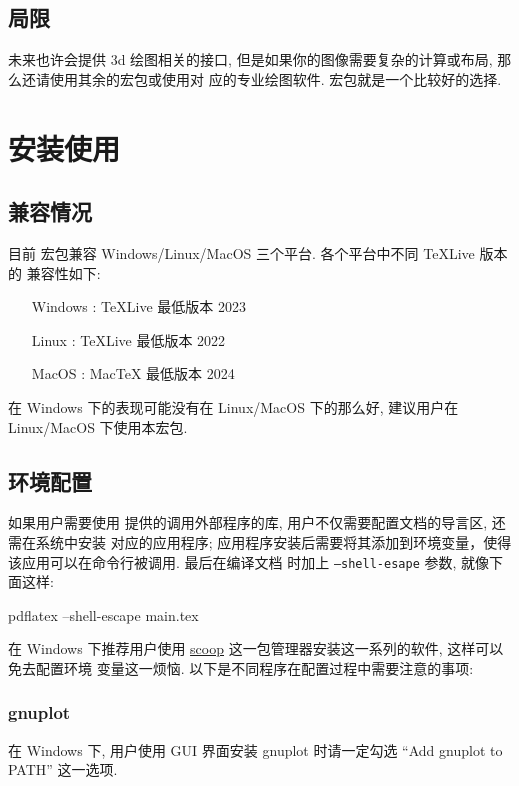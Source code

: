 \documentclass[
  hyper, lang=cn, 
  class=l3dox, 
]{../../zlatex/code/ztex}
\begin{document}
\subsection{局限}
\zTikZ{} 未来也许会提供 3d 绘图相关的接口, 但是如果你的图像需要复杂的计算或布局, 那么还请使用其余的宏包或使用对
应的专业绘图软件.  宏包就是一个比较好的选择.


\clearpage
\section{安装使用}


\subsection{兼容情况}
目前  宏包兼容 Windows/Linux/MacOS 三个平台. 各个平台中不同 \TeX{}Live 版本的
兼容性如下:

\hspace*{5cm}\parbox{\linewidth}{
\begin{itemize}
  \item [Windows] : \TeX{}Live 最低版本 2023
  \item [Linux] : \TeX{}Live 最低版本 2022
  \item [MacOS] : Mac\TeX{} 最低版本 2024
\end{itemize}}

\ztikz{} 在 Windows 下的表现可能没有在 Linux/MacOS 下的那么好, 建议用户在 Linux/MacOS 下使用本宏包.


\subsection{环境配置}
如果用户需要使用 \zTikZ{} 提供的调用外部程序的库, 用户不仅需要配置文档的导言区, 还需在系统中安装
对应的应用程序; 应用程序安装后需要将其添加到环境变量，使得该应用可以在命令行被调用. 最后在编译文档
时加上 \texttt{--shell-esape} 参数, 就像下面这样:
\def\exampleUR{}

\begin{DocExample}
  pdflatex --shell-escape main.tex
\end{DocExample}

在 Windows 下推荐用户使用 \href{https://scoop.sh/}{scoop} 这一包管理器安装这一系列的软件, 这样可以免去配置环境
变量这一烦恼. 以下是不同程序在配置过程中需要注意的事项:

\vspace*{-.5em}
\subsubsection{gnuplot}
在 Windows 下, 用户使用 GUI 界面安装 gnuplot 时请一定勾选 ``Add gnuplot to PATH'' 这一选项.
\end{document}
